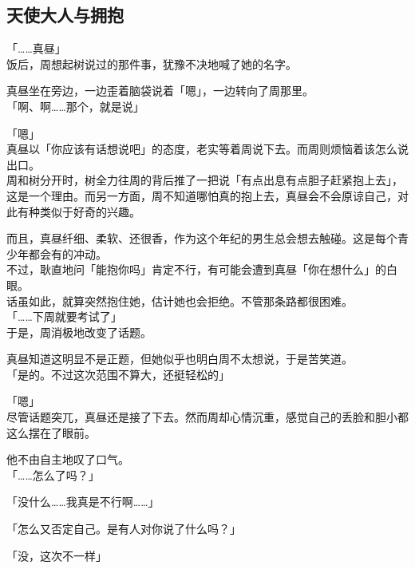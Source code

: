 \subsection{天使大人与拥抱}

「……真昼」\\

饭后，周想起树说过的那件事，犹豫不决地喊了她的名字。

真昼坐在旁边，一边歪着脑袋说着「嗯」，一边转向了周那里。\\

「啊、啊……那个，就是说」

「嗯」\\

真昼以「你应该有话想说吧」的态度，老实等着周说下去。而周则烦恼着该怎么说出口。\\

周和树分开时，树全力往周的背后推了一把说「有点出息有点胆子赶紧抱上去」，这是一个理由。而另一方面，周不知道哪怕真的抱上去，真昼会不会原谅自己，对此有种类似于好奇的兴趣。

而且，真昼纤细、柔软、还很香，作为这个年纪的男生总会想去触碰。这是每个青少年都会有的冲动。\\

不过，耿直地问「能抱你吗」肯定不行，有可能会遭到真昼「你在想什么」的白眼。\\

话虽如此，就算突然抱住她，估计她也会拒绝。不管那条路都很困难。\\

「……下周就要考试了」\\

于是，周消极地改变了话题。

真昼知道这明显不是正题，但她似乎也明白周不太想说，于是苦笑道。\\

「是的。不过这次范围不算大，还挺轻松的」

「嗯」\\

尽管话题突兀，真昼还是接了下去。然而周却心情沉重，感觉自己的丢脸和胆小都这么摆在了眼前。

他不由自主地叹了口气。\\

「……怎么了吗？」

「没什么……我真是不行啊……」

「怎么又否定自己。是有人对你说了什么吗？」

「没，这次不一样」\\

